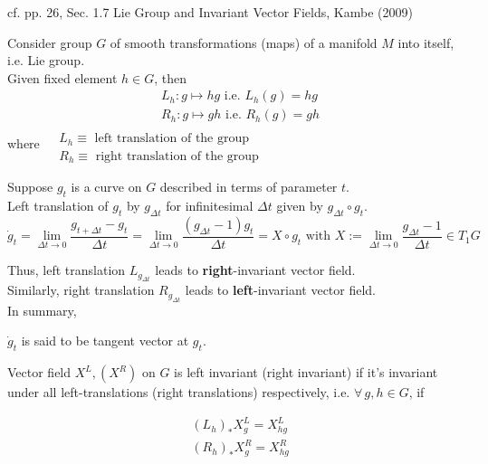 cf. pp. 26, Sec. 1.7 Lie Group and Invariant Vector Fields, Kambe (2009) \cite{dgdt:TKambe2009}

Consider group $G$ of smooth transformations (maps) of a manifold $M$ into itself, i.e. Lie group. \\

Given fixed element $h \in G$, then
\begin{equation}
\begin{aligned}
& L_h : g\mapsto hg \text{ i.e. } L_h(g) = hg \\
& R_h : g \mapsto gh \text{ i.e. } R_h(g) = gh
\end{aligned}
\end{equation}
where 
$ \begin{aligned} & \quad \\
& L_h \equiv \text{ left translation of the group } \\
& R_h \equiv \text{ right translation of the group } 
\end{aligned}$

Suppose $g_t$ is a curve on $G$ described in terms of parameter $t$. \\
Left translation of $g_t$ by $g_{\Delta t}$ for infinitesimal $\Delta t$ given by $g_{\Delta t} \circ g_t$. 
\begin{equation}
	\dot{g}_t = \lim_{\Delta t \to 0} \frac{g_{t + \Delta t} - g_t }{ \Delta t } = \lim_{\Delta t \to 0} \frac{ (g_{\Delta t} - 1) g_t }{ \Delta t} = X \circ g_t \text{ with } X := \lim_{\Delta t \to 0 } \frac{ g_{\Delta t} - 1}{ \Delta t}  \in T_1 G
\end{equation}

Thus, left translation $L_{g_{\Delta t}} $ leads to \textbf{right}-invariant vector field. \\
Similarly, right translation $R_{g_{\Delta t}}$ leads to \textbf{left}-invariant vector field. \\
In summary,


$\dot{g}_t$ is said to be tangent vector at $g_t$.

Vector field $X^L, (X^R)$ on $G$ is left invariant (right invariant) if it's invariant under all left-translations (right translations) respectively, i.e. $\forall \, g,h \in G$, if 

\begin{equation}
\begin{aligned}
	& (L_h)_* X^L_g = X^L_{hg} \\
	& (R_h)_* X^R_g = X^R_{hg} 	
\end{aligned}
\end{equation}

